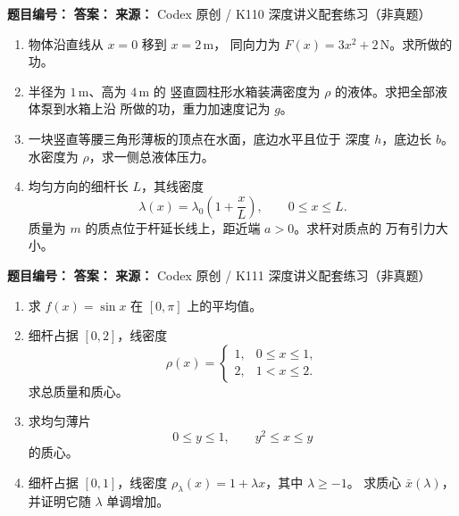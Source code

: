 
\begin{problemBox}
\begin{problemMeta}
\textbf{题目编号：} \quad
\textbf{答案：} \quad
\textbf{来源：} Codex 原创 / K110 深度讲义配套练习（非真题）
\end{problemMeta}
\begin{enumerate}
  \item[\textbf{A}] 物体沿直线从 \(x=0\) 移到 \(x=2\,\mathrm m\)，
  同向力为 \(F(x)=3x^2+2\,\mathrm N\)。求所做的功。
  \item[\textbf{B}] 半径为 \(1\,\mathrm m\)、高为 \(4\,\mathrm m\) 的
  竖直圆柱形水箱装满密度为 \(\rho\) 的液体。求把全部液体泵到水箱上沿
  所做的功，重力加速度记为 \(g\)。
  \item[\textbf{C}] 一块竖直等腰三角形薄板的顶点在水面，底边水平且位于
  深度 \(h\)，底边长 \(b\)。水密度为 \(\rho\)，求一侧总液体压力。
  \item[\textbf{M}] 均匀方向的细杆长 \(L\)，其线密度
  \[
  \lambda(x)=\lambda_0\left(1+\frac xL\right),\qquad0\le x\le L.
  \]
  质量为 \(m\) 的质点位于杆延长线上，距近端 \(a>0\)。求杆对质点的
  万有引力大小。
\end{enumerate}
\end{problemBox}

\begin{problemBox}
\begin{problemMeta}
\textbf{题目编号：} \quad
\textbf{答案：} \quad
\textbf{来源：} Codex 原创 / K111 深度讲义配套练习（非真题）
\end{problemMeta}
\begin{enumerate}
  \item[\textbf{A}] 求 \(f(x)=\sin x\) 在 \([0,\pi]\) 上的平均值。
  \item[\textbf{B}] 细杆占据 \([0,2]\)，线密度
  \[
  \rho(x)=
  \begin{cases}
  1,&0\le x\le1,\\
  2,&1<x\le2.
  \end{cases}
  \]
  求总质量和质心。
  \item[\textbf{C}] 求均匀薄片
  \[
  0\le y\le1,\qquad y^2\le x\le y
  \]
  的质心。
  \item[\textbf{M}] 细杆占据 \([0,1]\)，线密度
  \(\rho_\lambda(x)=1+\lambda x\)，其中 \(\lambda\ge-1\)。
  求质心 \(\bar x(\lambda)\)，并证明它随 \(\lambda\) 单调增加。
\end{enumerate}
\end{problemBox}
